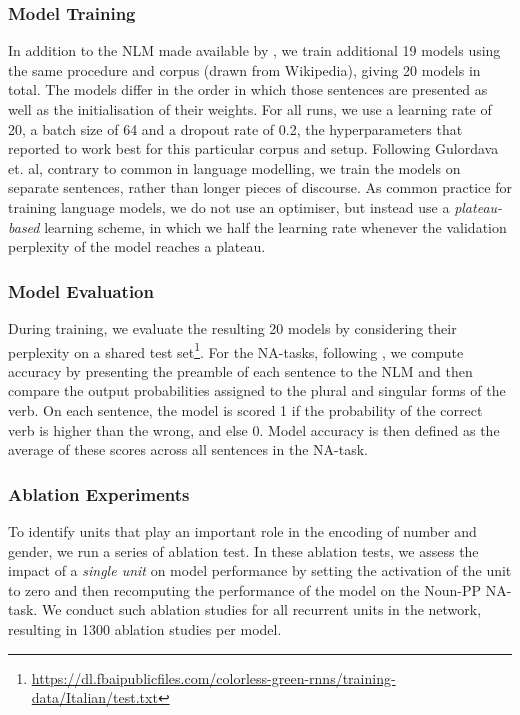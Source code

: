 \subsubsection{Model Training} 
In addition to the NLM made available by \citet{Gulordava:etal:2018}, we train additional 19 models using the same procedure and corpus (drawn from Wikipedia), giving 20 models in total. 
The models differ in the order in which those sentences are presented as well as the initialisation of their weights.
For all runs, we use a learning rate of 20, a batch size of 64 and a dropout rate of 0.2, the hyperparameters that \citet{Gulordava:etal:2018} reported to work best for this particular corpus and setup.
Following Gulordava et. al, contrary to common in language modelling, we train the models on separate sentences, rather than longer pieces of discourse.
As common practice for training language models, we do not use an optimiser, but instead use a \emph{plateau-based} learning scheme, in which we half the learning rate whenever the validation perplexity of the model reaches a plateau.

\subsubsection{Model Evaluation} During training, we evaluate the resulting 20 models by considering their perplexity on a shared test set\footnote{\url{https://dl.fbaipublicfiles.com/colorless-green-rnns/training-data/Italian/test.txt}}. For the NA-tasks, following \citet{Linzen:etal:2016}, we compute accuracy by presenting the preamble of each sentence to the NLM and then compare the output probabilities assigned to the plural and singular forms of the verb. On each sentence, the model is scored 1 if the probability of the correct verb is higher than the wrong, and else 0. Model accuracy is then defined as the average of these scores across all sentences in the NA-task.

\subsubsection{Ablation Experiments}
To identify units that play an important role in the encoding of number and gender, we run a series of ablation test.
In these ablation tests, we assess the impact of a \emph{single unit} on model performance by setting the activation of the unit to zero and then recomputing the performance of the model on the Noun-PP NA-task. 
We conduct such ablation studies for all recurrent units in the network, resulting in 1300 ablation studies per model.

